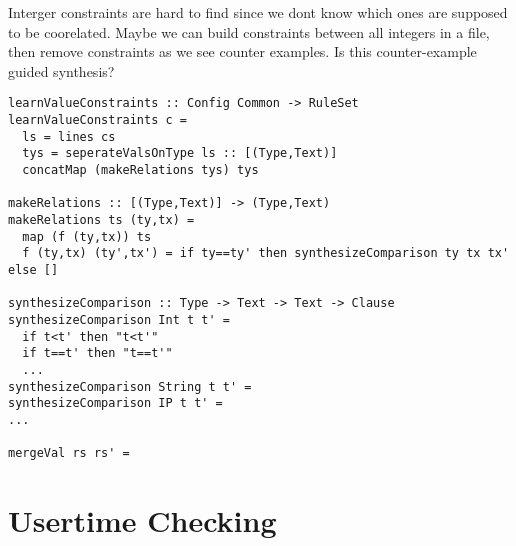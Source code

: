 \documentclass{article}
\begin{document}
Interger constraints are hard to find since we dont know which ones are supposed to be coorelated.
Maybe we can build constraints between all integers in a file, then remove constraints as we see counter examples.
Is this counter-example guided synthesis?

\begin{lstlisting}
learnValueConstraints :: Config Common -> RuleSet
learnValueConstraints c =
  ls = lines cs
  tys = seperateValsOnType ls :: [(Type,Text)]
  concatMap (makeRelations tys) tys

makeRelations :: [(Type,Text)] -> (Type,Text)
makeRelations ts (ty,tx) =
  map (f (ty,tx)) ts
  f (ty,tx) (ty',tx') = if ty==ty' then synthesizeComparison ty tx tx' else []

synthesizeComparison :: Type -> Text -> Text -> Clause
synthesizeComparison Int t t' =
  if t<t' then "t<t'"
  if t==t' then "t==t'"
  ...
synthesizeComparison String t t' =
synthesizeComparison IP t t' =
...

mergeVal rs rs' = 
\end{lstlisting}




\section{Usertime Checking}




\end{document}
